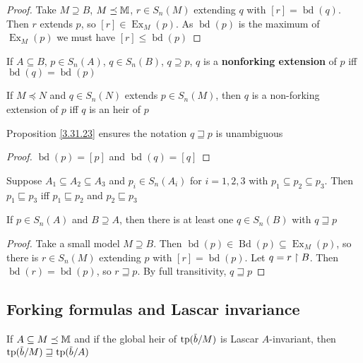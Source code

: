 \documentclass[11pt]{article}
\DeclareMathOperator{\Ex}{Ex}
\DeclareMathOperator{\Bd}{Bd}
\DeclareMathOperator{\tbd}{bd}
\begin{document}
\begin{proof}
Take \(M\supseteq B\), \(M\preceq\mathbb{M}\), \(r\in S_n(M)\) extending \(q\) with \([r]=\tbd(q)\). Then \(r\)
extends \(p\), so \([r]\in\Ex_M(p)\). As \(\tbd(p)\) is the maximum of \(\Ex_M(p)\) we must have \([r]\le\tbd(p)\)
\end{proof}

\begin{definition}[]
If \(A\subseteq B\), \(p\in S_n(A)\), \(q\in S_n(B)\), \(q\supseteq p\), \(q\) is a \textbf{nonforking extension} of \(p\)
iff \(\tbd(q)=\tbd(p)\)
\end{definition}

\begin{proposition}[]
\label{3.31.23}
If \(M\preceq N\) and \(q\in S_n(N)\) extends \(p\in S_n(M)\), then \(q\) is a non-forking extension
of \(p\) iff \(q\) is an heir of \(p\)
\end{proposition}

Proposition \ref{3.31.23} ensures the notation \(q\sqsupseteq p\) is unambiguous

\begin{proof}
\(\tbd(p)=[p]\) and \(\tbd(q)=[q]\)
\end{proof}

\begin{proposition}
Suppose \(A_1\subseteq A_2\subseteq A_3\) and \(p_i\in S_n(A_i)\) for \(i=1,2,3\) with \(p_1\subseteq p_2\subseteq p_3\).
Then \(p_1\sqsubseteq p_3\) iff \(p_1\sqsubseteq p_2\) and \(p_2\sqsubseteq p_3\)
\end{proposition}

\begin{proposition}[Extension]
If \(p\in S_n(A)\) and \(B\supseteq A\), then there is at least one \(q\in S_n(B)\) with \(q\sqsupseteq p\)
\end{proposition}

\begin{proof}
Take a small model \(M\supseteq B\). Then \(\tbd(p)\in\Bd(p)\subseteq\Ex_M(p)\), so there is \(r\in S_n(M)\)
extending \(p\) with \([r]=\tbd(p)\). Let \(q=r\upharpoonright B\). Then \(\tbd(r)=\tbd(p)\),
so \(r\sqsupseteq p\). By full transitivity, \(q\sqsupseteq p\)
\end{proof}

\subsection{Forking formulas and Lascar invariance}
\label{sec:org4fea236}
\begin{lemma}[]
\label{3.31.26}
If \(A\subseteq M\preceq\mathbb{M}\) and if the global heir of \(\tp(\barb/M)\) is Lascar \(A\)-invariant, then \(\tp(\barb/M)\sqsupseteq\tp(\barb/A)\)
\end{lemma}
\end{document}
